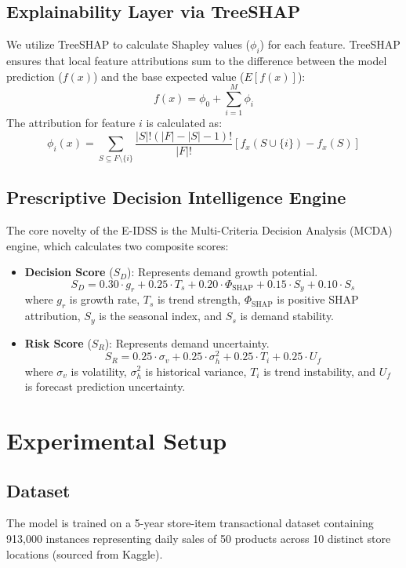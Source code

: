 \documentclass[conference]{IEEEtran}
\begin{document}
\subsection{Explainability Layer via TreeSHAP}
We utilize TreeSHAP to calculate Shapley values ($\phi_i$) for each feature. TreeSHAP ensures that local feature attributions sum to the difference between the model prediction ($f(x)$) and the base expected value ($E[f(x)]$):
\begin{equation}
f(x) = \phi_0 + \sum_{i=1}^{M} \phi_i
\end{equation}
The attribution for feature $i$ is calculated as:
\begin{equation}
\phi_i(x) = \sum_{S \subseteq F \setminus \{i\}} \frac{|S|!(|F| - |S| - 1)!}{|F|!} \left[ f_x(S \cup \{i\}) - f_x(S) \right]
\end{equation}

\subsection{Prescriptive Decision Intelligence Engine}
The core novelty of the E-IDSS is the Multi-Criteria Decision Analysis (MCDA) engine, which calculates two composite scores:
\begin{itemize}
\item \textbf{Decision Score} ($S_D$): Represents demand growth potential.
  \begin{equation}
  S_D = 0.30 \cdot g_r + 0.25 \cdot T_s + 0.20 \cdot \Phi_{\text{SHAP}} + 0.15 \cdot S_y + 0.10 \cdot S_s
  \end{equation}
  where $g_r$ is growth rate, $T_s$ is trend strength, $\Phi_{\text{SHAP}}$ is positive SHAP attribution, $S_y$ is the seasonal index, and $S_s$ is demand stability.
\item \textbf{Risk Score} ($S_R$): Represents demand uncertainty.
  \begin{equation}
  S_R = 0.25 \cdot \sigma_v + 0.25 \cdot \sigma_h^2 + 0.25 \cdot T_i + 0.25 \cdot U_f
  \end{equation}
  where $\sigma_v$ is volatility, $\sigma_h^2$ is historical variance, $T_i$ is trend instability, and $U_f$ is forecast prediction uncertainty.
\end{itemize}

\section{Experimental Setup}

\subsection{Dataset}
The model is trained on a 5-year store-item transactional dataset containing 913,000 instances representing daily sales of 50 products across 10 distinct store locations (sourced from Kaggle).
\end{document}
